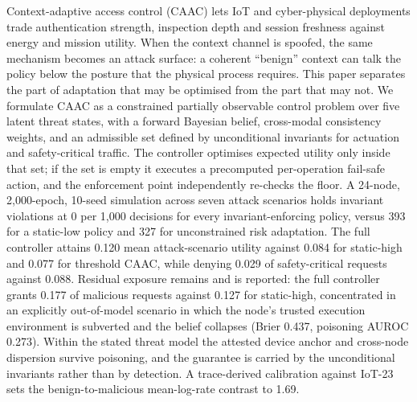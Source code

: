 Context-adaptive access control (CAAC) lets IoT and cyber-physical deployments trade
authentication strength, inspection depth and session freshness against energy and
mission utility. When the context channel is spoofed, the same mechanism becomes an
attack surface: a coherent ``benign'' context can talk the policy below the posture
that the physical process requires. This paper separates the part of adaptation that
may be optimised from the part that may not. We formulate CAAC as a constrained
partially observable control problem over five latent threat states, with a forward
Bayesian belief, cross-modal consistency weights, and an admissible set defined by
unconditional invariants for actuation and safety-critical traffic. The controller
optimises expected utility only inside that set; if the set is empty it executes a
precomputed per-operation fail-safe action, and the enforcement point independently
re-checks the floor. A 24-node, 2{,}000-epoch, 10-seed simulation across seven attack
scenarios holds invariant violations at 0 per 1{,}000 decisions for every
invariant-enforcing policy, versus 393 for a static-low policy and 327 for
unconstrained risk adaptation. The full controller attains 0.120 mean
attack-scenario utility against 0.084 for static-high and 0.077 for threshold CAAC,
while denying 0.029 of safety-critical requests against 0.088. Residual exposure
remains and is reported: the full controller grants 0.177 of malicious requests
against 0.127 for static-high, concentrated in an explicitly out-of-model scenario
in which the node's trusted execution environment is subverted and the belief
collapses (Brier 0.437, poisoning AUROC 0.273). Within the stated threat model the
attested device anchor and cross-node dispersion survive poisoning, and the
guarantee is carried by the unconditional invariants rather than by detection. A
trace-derived calibration against IoT-23 sets the benign-to-malicious mean-log-rate
contrast to 1.69.
